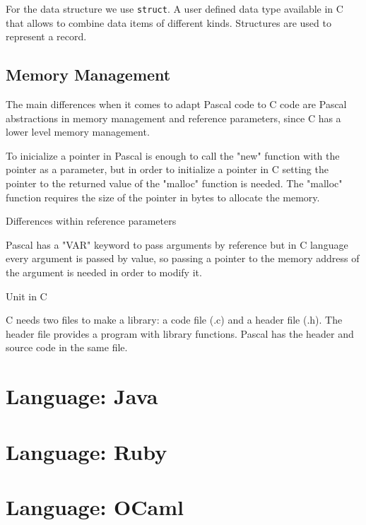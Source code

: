 \documentclass[11pt]{scrartcl} %
\begin{document}
For the data structure we use \texttt{struct}. A user defined data type available in C that allows to combine data items of different kinds. Structures are used to represent a record. 

\subsection*{Memory Management}

The main differences when it comes to adapt Pascal code to C code are Pascal abstractions in memory management and reference parameters, since C has a lower level memory management.

	To inicialize a pointer in Pascal is enough to call the "new" function with the pointer as a parameter, but in order to initialize a pointer in C
	setting the pointer to the returned value of the "malloc" function is needed. The "malloc" function requires the size of the pointer in bytes to allocate
	the memory.

Differences within reference parameters

	Pascal has a "VAR" keyword to pass arguments by reference but in C language every argument is passed by value, so passing a pointer to the memory address
	of the argument is needed in order to modify it.



Unit in C


	C needs two files to make a library: a code file (.c) and a header file (.h). The header file provides a program with library functions.
	Pascal has the header and source code in the same file.

\section{Language: Java}
\section{Language: Ruby}
\section{Language: OCaml}
\end{document}
